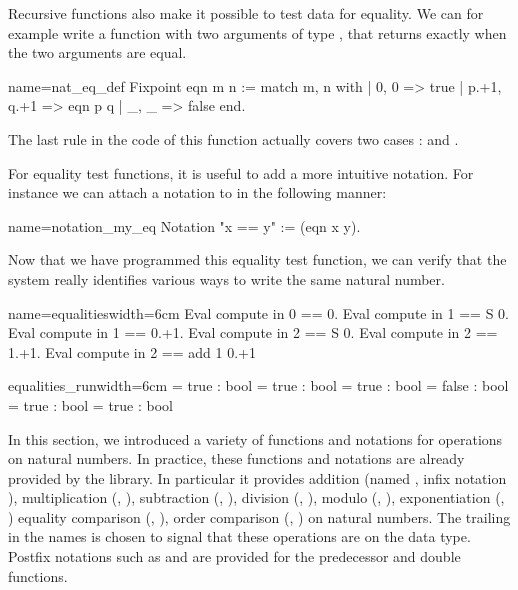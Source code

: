 Recursive functions also make it possible to test data for
equality. We can for example write a function with two arguments of
type , that
returns  exactly when the two arguments are equal.


\begin{coq}{name=nat_eq_def}{}
Fixpoint eqn m n :=
  match m, n with
  | 0, 0 => true
  | p.+1, q.+1 => eqn p q
  | _, _ => false
  end.
\end{coq}
The last rule in the code of this function actually covers two cases :
 and .

For equality test functions, it is useful to add a more intuitive
notation.  For instance we can attach a notation to  in
the following manner:

\begin{coq}{name=notation_my_eq}{}
Notation "x == y" := (eqn x y).
\end{coq}
Now
that we have programmed this equality test function, we can verify
that the \Coq{} system really identifies various ways to write the same
natural number.

\begin{coq}{name=equalities}{width=6cm}
Eval compute in 0 == 0.
Eval compute in 1 == S 0.
Eval compute in 1 == 0.+1.
Eval compute in 2 == S 0.
Eval compute in 2 == 1.+1.
Eval compute in 2 == add 1 0.+1
\end{coq}
\begin{coqout}{equalities_run}{width=6cm}
= true : bool
= true : bool
= true : bool
= false : bool
= true : bool
= true : bool
\end{coqout}

In this section, we introduced a variety of functions and notations
for operations on natural numbers.  In practice, these functions and
notations are already provided by the \mcbMC{} library.  In particular
it provides addition (named , infix notation \C{+}),
multiplication
(, \C{*}), subtraction (, \C{-}), division (,
\C{\%/}),  modulo (, \C{\%\%}), exponentiation (, \C{\^})
equality comparison (, \C{==}), order
comparison (, \C{<=}) on natural numbers.  The trailing  in
the names is chosen to signal that these operations are on the  data
type.  Postfix notations such as  and  are provided for
the predecessor and double functions.


